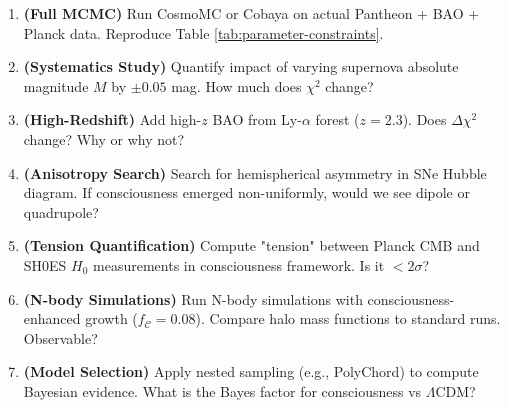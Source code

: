 \begin{enumerate}
\item \textbf{(Full MCMC)} Run CosmoMC\cite{lewis2000} or Cobaya\cite{torrado2021} on actual Pantheon + BAO + Planck data. Reproduce Table \ref{tab:parameter-constraints}.

\item \textbf{(Systematics Study)} Quantify impact of varying supernova absolute magnitude $M$ by $\pm 0.05$ mag. How much does $\chi^2$ change?

\item \textbf{(High-Redshift)} Add high-$z$ BAO from Ly-$\alpha$ forest ($z = 2.3$). Does $\Delta \chi^2$ change? Why or why not?

\item \textbf{(Anisotropy Search)} Search for hemispherical asymmetry in SNe Hubble diagram. If consciousness emerged non-uniformly, would we see dipole or quadrupole?

\item \textbf{(Tension Quantification)} Compute "tension" between Planck CMB and SH0ES $H_0$ measurements in consciousness framework. Is it $< 2\sigma$?

\item \textbf{(N-body Simulations)} Run N-body simulations with consciousness-enhanced growth ($f_{\mathcal{C}} = 0.08$). Compare halo mass functions to standard runs. Observable?

\item \textbf{(Model Selection)} Apply nested sampling (e.g., PolyChord\cite{handley2015}) to compute Bayesian evidence. What is the Bayes factor for consciousness vs $\Lambda$CDM?
\end{enumerate}
